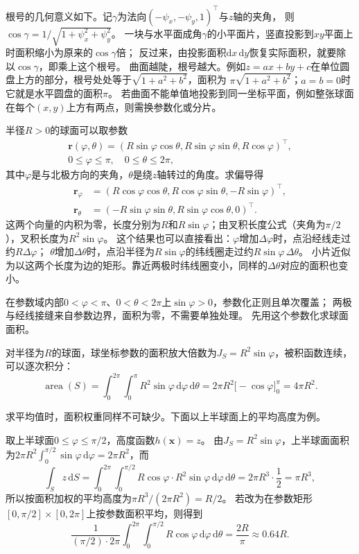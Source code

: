 根号的几何意义如下。记$\gamma$为法向$(-\psi_x,-\psi_y,1)^\top$与$z$轴的夹角，
则$\cos\gamma=1/\sqrt{1+\psi_x^2+\psi_y^2}$。
一块与水平面成角$\gamma$的小平面片，竖直投影到$xy$平面上时面积缩小为原来的$\cos\gamma$倍；
反过来，由投影面积$\mathrm dx\,\mathrm dy$恢复实际面积，就要除以$\cos\gamma$，即乘上这个根号。
曲面越陡，根号越大。例如$z=ax+by+c$在单位圆盘上方的部分，根号处处等于$\sqrt{1+a^2+b^2}$，面积为
$\pi\sqrt{1+a^2+b^2}$；$a=b=0$时它就是水平圆盘的面积$\pi$。
若曲面不能单值地投影到同一坐标平面，例如整张球面在每个$(x,y)$上方有两点，则需换参数化或分片。

半径$R>0$的球面可以取参数
\[
 \begin{gathered}
 \bm r(\varphi,\theta)
 =(R\sin\varphi\cos\theta,R\sin\varphi\sin\theta,R\cos\varphi)^\top,\\
 0\leq\varphi\leq\pi,\quad 0\leq\theta\leq2\pi,
 \end{gathered}
\]
其中$\varphi$是与北极方向的夹角，$\theta$是绕$z$轴转过的角度。求偏导得
\[
 \begin{aligned}
 \bm r_\varphi&=(R\cos\varphi\cos\theta,R\cos\varphi\sin\theta,-R\sin\varphi)^\top,\\
 \bm r_\theta&=(-R\sin\varphi\sin\theta,R\sin\varphi\cos\theta,0)^\top.
 \end{aligned}
\]
这两个向量的内积为零，长度分别为$R$和$R\sin\varphi$；由叉积长度公式（夹角为$\pi/2$），叉积长度为$R^2\sin\varphi$。
这个结果也可以直接看出：$\varphi$增加$\Delta\varphi$时，点沿经线走过约$R\Delta\varphi$；
$\theta$增加$\Delta\theta$时，点沿半径为$R\sin\varphi$的纬线圈走过约$R\sin\varphi\,\Delta\theta$。
小片近似为以这两个长度为边的矩形。靠近两极时纬线圈变小，同样的$\Delta\theta$对应的面积也变小。

在参数域内部$0<\varphi<\pi$、$0<\theta<2\pi$上$\sin\varphi>0$，参数化正则且单次覆盖；
两极与经线接缝来自参数边界，面积为零，不需要单独处理。
先用这个参数化求球面面积。

\begin{example}[球面的面积]
\label{ex:analysis-sphere-area}
对半径为$R$的球面，球坐标参数的面积放大倍数为$J_S=R^2\sin\varphi$，被积函数连续，可以逐次积分：
\[
 \operatorname{area}(S)
 =\int_0^{2\pi}\int_0^\pi R^2\sin\varphi\,\mathrm d\varphi\,\mathrm d\theta
 =2\pi R^2\bigl[-\cos\varphi\bigr]_0^\pi
 =4\pi R^2.
\]
\end{example}

求平均值时，面积权重同样不可缺少。下面以上半球面上的平均高度为例。

\begin{example}[上半球面的平均高度]
\label{ex:analysis-hemisphere-average-height}
取上半球面$0\leq\varphi\leq\pi/2$，高度函数$h(\bm x)=z$。
由$J_S=R^2\sin\varphi$，上半球面面积为$2\pi R^2\int_0^{\pi/2}\sin\varphi\,\mathrm d\varphi=2\pi R^2$，而
\[
 \int_Sz\,\mathrm dS
 =\int_0^{2\pi}\int_0^{\pi/2}R\cos\varphi\cdot R^2\sin\varphi\,\mathrm d\varphi\,\mathrm d\theta
 =2\pi R^3\cdot\frac12=\pi R^3,
\]
所以按面积加权的平均高度为$\pi R^3/(2\pi R^2)=R/2$。
若改为在参数矩形$[0,\pi/2]\times[0,2\pi]$上按参数面积平均，则得到
\[
 \frac1{(\pi/2)\cdot2\pi}\int_0^{2\pi}\int_0^{\pi/2}R\cos\varphi\,\mathrm d\varphi\,\mathrm d\theta
 =\frac{2R}{\pi}\approx0.64R.
\]
\end{example}

